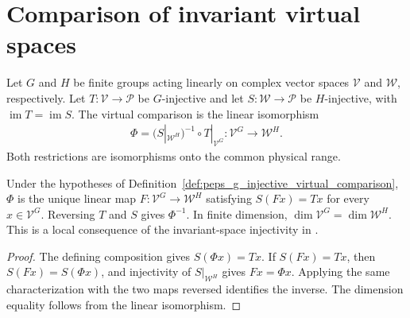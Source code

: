 \section{Comparison of invariant virtual spaces}%
\label{sec:peps_g_injective_virtual_comparison}

\begin{definition}%
    \label{def:peps_g_injective_virtual_comparison}
    \leanok
    Let $G$ and $H$ be finite groups acting linearly on complex
    vector spaces $\mathcal V$ and $\mathcal W$, respectively.
    Let $T:\mathcal V\to\mathcal P$ be $G$-injective and let
    $S:\mathcal W\to\mathcal P$ be $H$-injective, with
    $\operatorname{im}T=\operatorname{im}S$.
    The virtual comparison is the linear isomorphism
    \begin{align}
        \Phi=(S|_{\mathcal W^H})^{-1}\circ T|_{\mathcal V^G}
        :\mathcal V^G\longrightarrow\mathcal W^H.
    \end{align}
    Both restrictions are isomorphisms onto the common physical range.
\end{definition}

\begin{lemma}%
    \label{thm:peps_g_injective_virtual_comparison}
    \leanok
    Under the hypotheses of
    Definition~\ref{def:peps_g_injective_virtual_comparison},
    $\Phi$ is the unique linear map
    $F:\mathcal V^G\to\mathcal W^H$ satisfying $S(Fx)=Tx$
    for every $x\in\mathcal V^G$.
    Reversing $T$ and $S$ gives $\Phi^{-1}$.
    In finite dimension, $\dim\mathcal V^G=\dim\mathcal W^H$.
    This is a local consequence of the invariant-space injectivity in
    \cite[Definition~5.1]{Schuch2010PEPS}.
\end{lemma}

\begin{proof}\leanok
    The defining composition gives $S(\Phi x)=Tx$.
    If $S(Fx)=Tx$, then $S(Fx)=S(\Phi x)$, and injectivity of
    $S|_{\mathcal W^H}$ gives $Fx=\Phi x$.
    Applying the same characterization with the two maps reversed
    identifies the inverse. The dimension equality follows from the
    linear isomorphism.
\end{proof}
